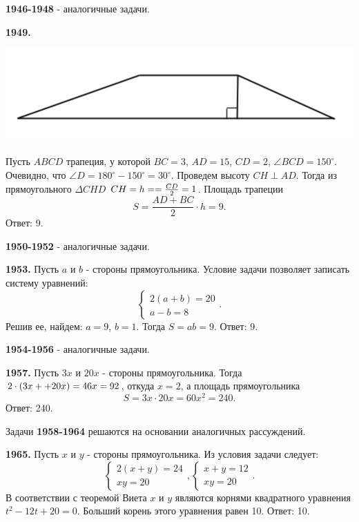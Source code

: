 \textbf{1946-1948} - аналогичные задачи.

\textbf{1949.}

{\centering \includegraphics[width=0.6\linewidth]{Geometry/Content/30.png}
	
}

Пусть $ABCD$ трапеция, у которой $BC = 3$, $AD = 15$, $CD = 2$, $\angle BCD = 150^\circ$. Очевидно, что $\angle D = 180^\circ - 150^\circ = 30^\circ$. Проведем высоту $CH \perp AD$. Тогда из прямоугольного $\Delta CHD$ $CH = h= \linebreak = \frac{CD}{2} = 1$. Площадь трапеции
\[
S = \frac{AD+BC}{2}\cdot h = 9.
\] \null \hspace*{\fill} Ответ: 9.

\textbf{1950-1952} - аналогичные задачи.

\textbf{1953.} Пусть $a$ и $b$ - стороны прямоугольника. Условие задачи позволяет записать систему уравнений:
\[
\begin{cases}
	2(a+b)=20 \\
	a-b=8
\end{cases}.
\]
Решив ее, найдем: $a =9$, $b = 1$. Тогда $S = ab = 9.$ \newline \null \hspace*{\fill} Ответ: 9.

\textbf{1954-1956} - аналогичные задачи.

\textbf{1957.} Пусть $3x$ и $20x$ - стороны прямоугольника. Тогда $2\cdot(3x+\linebreak+20x)=46x=92$, откуда $x =2$, а площадь прямоугольника
\[
S = 3x\cdot20x=60x^2=240.
\]
\null \hspace*{\fill} Ответ: 240.

Задачи \textbf{1958-1964} решаются на основании аналогичных рассуждений.

\textbf{1965.} Пусть $x$ и $y$ -  стороны прямоугольника. Из условия задачи следует:
\[
\begin{cases} 
	2(x+y)=24\\
	xy=20
\end{cases},
\begin{cases}
	x+y=12\\
	xy=20
\end{cases}.
\]
В соответствии с теоремой Виета $x$ и $y$ являются корнями квадратного уравнения $t^2-12t+20=0$. Больший корень этого уравнения равен 10. \newline \null \hspace*{\fill} Ответ: 10.

